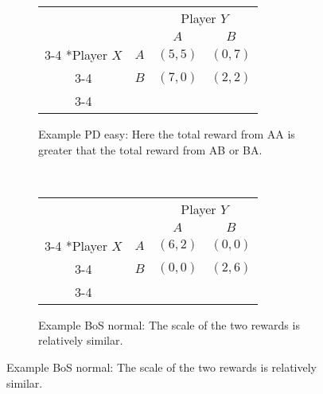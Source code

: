 \documentclass{article}
\begin{document}
\begin{figure}
		\bigskip
								\begin{subfigure}[b]{0.45\textwidth}
			\caption{Example PD easy: Here the total reward from AA is greater that the total reward from AB or BA.}
			\label{payoff-PDeasy}
			\begin{tabular}{cc|c|c|}
				& \multicolumn{1}{c}{} & \multicolumn{2}{c}{Player $Y$}\\
				& \multicolumn{1}{c}{} & \multicolumn{1}{c}{$A$}  & \multicolumn{1}{c}{$B$} \\\cline{3-4}
				\multirow{2}*{Player $X$}  & $A$ & $(5,5)$ & $(0,7)$ \\\cline{3-4}
				& $B$ & $(7,0)$ & $(2,2)$ \\\cline{3-4}
			\end{tabular}
		\end{subfigure}
		~~~~
		\begin{subfigure}[b]{0.45\textwidth}
			\caption{Example BoS normal: The scale of the two rewards is relatively similar. }
			\label{payoff-BoSnormal}
			\begin{tabular}{cc|c|c|}
				& \multicolumn{1}{c}{} & \multicolumn{2}{c}{Player $Y$}\\
				& \multicolumn{1}{c}{} & \multicolumn{1}{c}{$A$}  & \multicolumn{1}{c}{$B$} \\\cline{3-4}
				\multirow{2}*{Player $X$}  & $A$ & $(6, 2)$ & $(0,0)$ \\\cline{3-4}
				& $B$ & $(0,0)$ & $(2,6)$ \\\cline{3-4}
			\end{tabular}
		\end{subfigure}
		

\end{figure}
\end{document}
